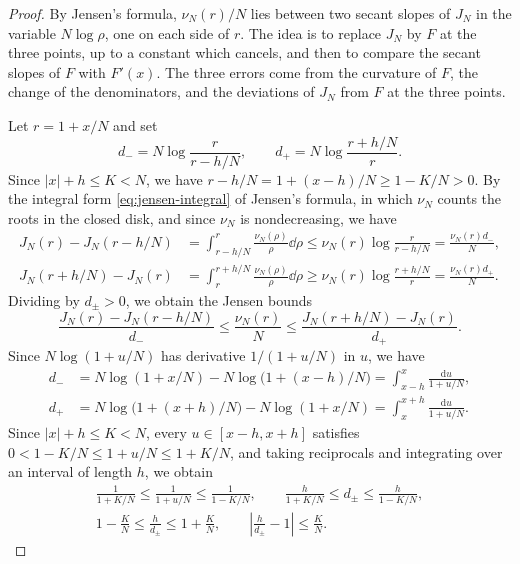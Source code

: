 \begin{proof}
By Jensen's formula, $\nu_N(r)/N$ lies between two secant slopes of
$J_N$ in the variable $N\log\rho$, one on each side of $r$. The idea is
to replace $J_N$ by $F$ at the three points, up to a constant which
cancels, and then to compare the secant slopes of $F$ with $F'(x)$.
The three errors come from the curvature of $F$, the change of the
denominators, and the deviations of $J_N$ from $F$ at the three points.

Let $r=1+x/N$ and set
\[
 d_-=N\log\frac{r}{r-h/N},\qquad
 d_+=N\log\frac{r+h/N}{r}.
\]
Since $|x|+h\leq K<N$, we have $r-h/N=1+(x-h)/N\geq1-K/N>0$.
By the integral form \eqref{eq:jensen-integral} of Jensen's formula,
in which $\nu_N$ counts the roots in the closed disk, and since $\nu_N$ is
nondecreasing, we have
\begin{align*}
 J_N(r)-J_N(r-h/N)
 &=\int_{r-h/N}^r\frac{\nu_N(\rho)}\rho\dd\rho
 \leq\nu_N(r)\log\frac r{r-h/N}
 =\frac{\nu_N(r)d_-}N,\\
 J_N(r+h/N)-J_N(r)
 &=\int_r^{r+h/N}\frac{\nu_N(\rho)}\rho\dd\rho
 \geq\nu_N(r)\log\frac{r+h/N}r
 =\frac{\nu_N(r)d_+}N.
\end{align*}
Dividing by $d_\pm>0$, we obtain the Jensen bounds
\[
 \frac{J_N(r)-J_N(r-h/N)}{d_-}
 \leq\frac{\nu_N(r)}N
 \leq\frac{J_N(r+h/N)-J_N(r)}{d_+}.
\]
Since $N\log(1+u/N)$ has derivative $1/(1+u/N)$ in $u$, we have
\begin{align*}
 d_-&=N\log(1+x/N)-N\log\bigl(1+(x-h)/N\bigr)
 =\int_{x-h}^x\frac{\mathrm du}{1+u/N},\\
 d_+&=N\log\bigl(1+(x+h)/N\bigr)-N\log(1+x/N)
 =\int_x^{x+h}\frac{\mathrm du}{1+u/N}.
\end{align*}
Since $|x|+h\leq K<N$, every $u\in[x-h,x+h]$ satisfies
$0<1-K/N\leq1+u/N\leq1+K/N$, and taking reciprocals and integrating over
an interval of length $h$, we obtain
\begin{gather*}
 \frac1{1+K/N}\leq\frac1{1+u/N}\leq\frac1{1-K/N},\qquad
 \frac h{1+K/N}\leq d_\pm\leq\frac h{1-K/N},\\
 1-\frac KN\leq\frac h{d_\pm}\leq1+\frac KN,\qquad
 \left|\frac h{d_\pm}-1\right|\leq\frac KN.
\end{gather*}


\end{proof}
